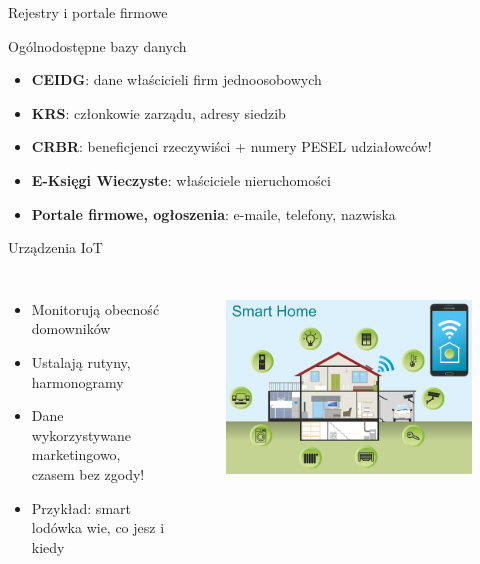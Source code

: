 \begin{frame}{Rejestry i portale firmowe}
\begin{block}{Ogólnodostępne bazy danych}
\begin{itemize}
  \item \textbf{CEIDG}: dane właścicieli firm jednoosobowych
  \item \textbf{KRS}: członkowie zarządu, adresy siedzib
  \item \textbf{CRBR}: beneficjenci rzeczywiści + numery PESEL udziałowców!
  \item \textbf{E-Księgi Wieczyste}: właściciele nieruchomości
  \item \textbf{Portale firmowe, ogłoszenia}: e-maile, telefony, nazwiska \cite{zrodloDzialalnosc}
\end{itemize}
\end{block}
\end{frame}

\begin{frame}{Urządzenia IoT}
\begin{columns}[c]
    \begin{itemize}
        \item Monitorują obecność domowników
        \item Ustalają rutyny, harmonogramy
        \item Dane wykorzystywane marketingowo, czasem bez zgody!
        \item Przykład: smart lodówka wie, co jesz i kiedy \cite{zrodlo2}
      \end{itemize}
    \centering
    \begin{figure}
        \centering
        \includegraphics[width=1\textwidth]{images/smart-home.png}
        \label{fig:smart-home}
    \end{figure}    
\end{columns}
\end{frame}

